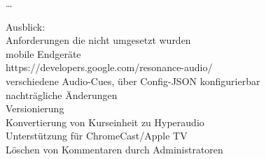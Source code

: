 \dots


Ausblick:\\
Anforderungen die nicht umgesetzt wurden\\
mobile Endgeräte\\
https://developers.google.com/resonance-audio/\\
verschiedene Audio-Cues, über Config-JSON konfigurierbar\\
nachträgliche Änderungen\\
Versionierung\\
Konvertierung von Kurseinheit zu Hyperaudio\\
Unterstützung für ChromeCast/Apple TV\\
Löschen von Kommentaren durch Administratoren\\